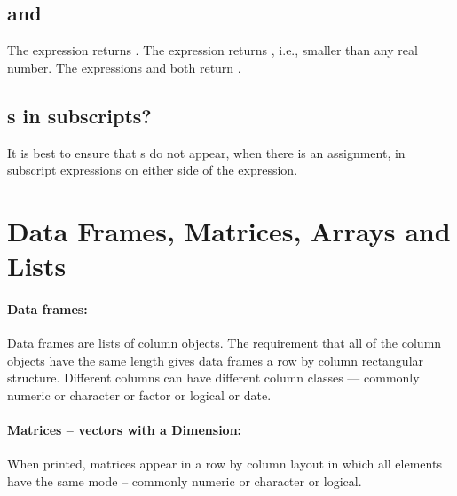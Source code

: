 \subsection*{ and }

The expression  returns .
The expression  returns ,
i.e., smaller than any real number. The expressions  and
 both return .

\subsection*{s in subscripts?}

It is best to ensure that s do not appear, when there
is an assignment, in subscript expressions on either side of the
expression.

\section{Data Frames, Matrices, Arrays and Lists}\label{sec:dframes}

\paragraph{Data frames:} Data frames are lists of column objects.
The requirement that all
of the column objects have the same length gives data frames a row
by column rectangular structure.  Different columns can have different
column classes --- commonly numeric or character or factor or logical
or date.

\paragraph{Matrices -- vectors with a Dimension:}
When printed, matrices appear in a row by column layout in which all
elements have the same mode -- commonly numeric or character or
logical.

